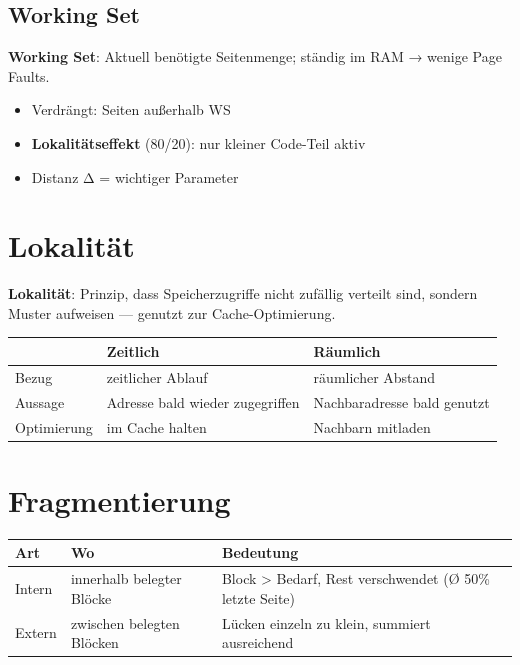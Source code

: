 \documentclass[11pt, a4paper]{article}
\begin{document}
\subsection{Working Set}
\textbf{Working Set}: Aktuell benötigte Seitenmenge; ständig im RAM → wenige Page Faults.

\begin{itemize}
  \item Verdrängt: Seiten außerhalb WS
  \item \textbf{Lokalitätseffekt} (80/20): nur kleiner Code-Teil aktiv
  \item Distanz Δ = wichtiger Parameter
\end{itemize}


\section{Lokalität}

\textbf{Lokalität}: Prinzip, dass Speicherzugriffe nicht zufällig verteilt sind, sondern Muster aufweisen — genutzt zur Cache-Optimierung.



{\small
\begin{tabularx}{\linewidth}{XXX}
\hline
\rowcolor{tableheadbg}
{\color{white}\textbf{}} & {\color{white}\textbf{Zeitlich}} & {\color{white}\textbf{Räumlich}} \\[2pt]
\hline
\endhead
\hline
\endfoot
Bezug & zeitlicher Ablauf & räumlicher Abstand \\
Aussage & Adresse bald wieder zugegriffen & Nachbaradresse bald genutzt \\
Optimierung & im Cache halten & Nachbarn mitladen \\
\end{tabularx}
}



\section{Fragmentierung}


{\small
\begin{tabularx}{\linewidth}{XXX}
\hline
\rowcolor{tableheadbg}
{\color{white}\textbf{Art}} & {\color{white}\textbf{Wo}} & {\color{white}\textbf{Bedeutung}} \\[2pt]
\hline
\endhead
\hline
\endfoot
Intern & innerhalb belegter Blöcke & Block > Bedarf, Rest verschwendet (Ø 50\% letzte Seite) \\
Extern & zwischen belegten Blöcken & Lücken einzeln zu klein, summiert ausreichend \\
\end{tabularx}
}
\end{document}
